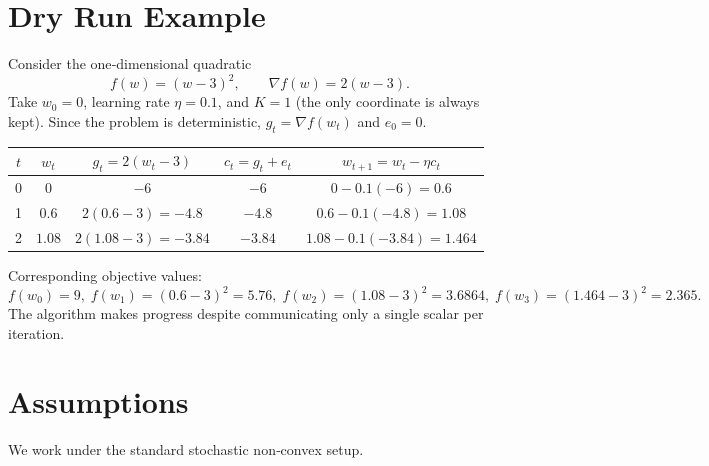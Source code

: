 \documentclass{article}
\begin{document}
\section*{Dry Run Example}
Consider the one‑dimensional quadratic
\[
f(w) = (w-3)^{2},\qquad \nabla f(w)=2(w-3).
\]
Take $w_{0}=0$, learning rate $\eta=0.1$, and $K=1$ (the only coordinate is always kept).  
Since the problem is deterministic, $g_{t}=\nabla f(w_{t})$ and $e_{0}=0$.

\begin{center}
\begin{tabular}{c|c|c|c|c}
$t$ & $w_{t}$ & $g_{t}=2(w_{t}-3)$ & $c_{t}=g_{t}+e_{t}$ & $w_{t+1}=w_{t}-\eta c_{t}$ \\ \hline
0 & $0$   & $-6$ & $-6$ & $0-0.1(-6)=0.6$ \\
1 & $0.6$ & $2(0.6-3)=-4.8$ & $-4.8$ & $0.6-0.1(-4.8)=1.08$ \\
2 & $1.08$& $2(1.08-3)=-3.84$ & $-3.84$ & $1.08-0.1(-3.84)=1.464$ \\
\end{tabular}
\end{center}
Corresponding objective values:
\[
f(w_{0})=9,\; f(w_{1})=(0.6-3)^{2}=5.76,\;
f(w_{2})=(1.08-3)^{2}=3.6864,\;
f(w_{3})=(1.464-3)^{2}=2.365.
\]
The algorithm makes progress despite communicating only a single scalar per iteration.

\section*{Assumptions}
We work under the standard stochastic non‑convex setup.
\end{document}
